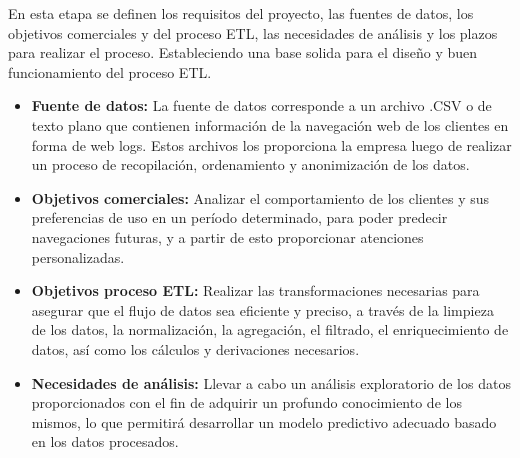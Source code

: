 En esta etapa se definen los requisitos del proyecto, las fuentes de datos, los objetivos comerciales y del proceso ETL, las necesidades de análisis y los plazos para realizar el proceso. Estableciendo una base solida para el diseño y buen funcionamiento del proceso ETL.
\begin{itemize}
    \item \textbf{Fuente de datos:} La fuente de datos corresponde a un archivo .CSV o de texto plano que contienen información de la navegación web de los clientes en forma de web logs. Estos archivos los proporciona la empresa luego de realizar un proceso de recopilación, ordenamiento y anonimización de los datos.
    \item \textbf{Objetivos comerciales:} Analizar el comportamiento de los clientes y sus preferencias de uso en un período determinado, para poder predecir navegaciones futuras, y a partir de esto proporcionar atenciones personalizadas.
    \item \textbf{Objetivos proceso ETL:} Realizar las transformaciones necesarias para asegurar que el flujo de datos sea eficiente y preciso, a través de la limpieza de los datos, la normalización, la agregación, el filtrado, el enriquecimiento de datos, así como los cálculos y derivaciones necesarios.
    \item \textbf{Necesidades de análisis:} Llevar a cabo un análisis exploratorio de los datos proporcionados con el fin de adquirir un profundo conocimiento de los mismos, lo que permitirá desarrollar un modelo predictivo adecuado basado en los datos procesados.
\end{itemize}

